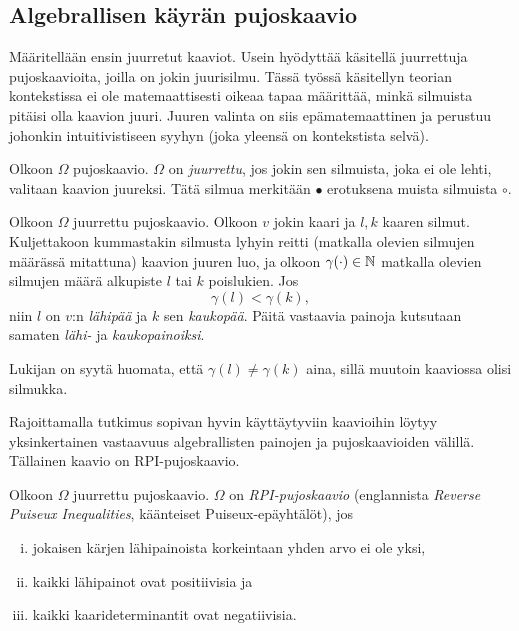 \subsection{Algebrallisen käyrän pujoskaavio}
Määritellään ensin juurretut kaaviot. Usein hyödyttää käsitellä juurrettuja pujoskaavioita, joilla on jokin juurisilmu. Tässä työssä käsitellyn teorian kontekstissa ei ole matemaattisesti oikeaa tapaa määrittää, minkä silmuista pitäisi olla kaavion juuri. Juuren valinta on siis epämatemaattinen ja perustuu johonkin intuitivistiseen syyhyn (joka yleensä on kontekstista selvä).
\begin{maaritelma}
    Olkoon $\Omega$ pujoskaavio. $\Omega$ on \emph{juurrettu}, jos jokin sen silmuista, joka ei ole lehti, valitaan kaavion juureksi. Tätä silmua merkitään $\bullet$ erotuksena muista silmuista $\circ$.
\end{maaritelma}
\begin{maaritelma}
    Olkoon $\Omega$ juurrettu pujoskaavio. Olkoon $v$ jokin kaari ja $l,k$ kaaren silmut. Kuljettakoon kummastakin silmusta lyhyin reitti (matkalla olevien silmujen määrässä mitattuna) kaavion juuren luo, ja olkoon $\gamma(\cdot)\in\mathbb{N}$ matkalla olevien silmujen määrä alkupiste $l$ tai $k$ poislukien. Jos
    \begin{equation*}
        \gamma(l)<\gamma(k),
    \end{equation*}
    niin $l$ on $v$:n \emph{lähipää} ja $k$ sen \emph{kaukopää}. Päitä vastaavia painoja kutsutaan samaten \emph{lähi-} ja \emph{kaukopainoiksi}.
\end{maaritelma}
\begin{huomautus}
    Lukijan on syytä huomata, että $\gamma(l)\ne\gamma(k)$ aina, sillä muutoin kaaviossa olisi silmukka.
\end{huomautus}
Rajoittamalla tutkimus sopivan hyvin käyttäytyviin kaavioihin löytyy yksinkertainen vastaavuus algebrallisten painojen ja pujoskaavioiden välillä. Tällainen kaavio on RPI-pujoskaavio.
\begin{maaritelma}
    Olkoon $\Omega$ juurrettu pujoskaavio. $\Omega$ on \emph{RPI-pujoskaavio} (englannista \emph{Reverse Puiseux Inequalities}, käänteiset Puiseux-epäyhtälöt), jos 
    \begin{enumerate}[i.]
        \item jokaisen kärjen lähipainoista korkeintaan yhden arvo ei ole yksi,
        \item kaikki lähipainot ovat positiivisia ja
        \item kaikki kaarideterminantit ovat negatiivisia.
    \end{enumerate}
\end{maaritelma}
